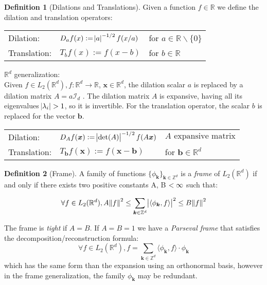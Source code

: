 \documentclass{InsightArticle}
\theoremstyle{definition}
\newtheorem{definition}{Definition}[section]
\begin{document}
\begin{definition}[Dilations and Translations]
  Given a function $f\in\mathbb{R}$ we define the dilation and translation operators\cite{heil_continuous_1989}:\par
  \begin{tabular}{lll}
    Dilation:&  $D_a f(x):=\abs{a}^{-1/2}f(x/a)$ &for $a \in \mathbb{R}\backslash\{0\}$ \\
    Translation:&   $T_b f(x):=f(x-b)$ &for $b \in \mathbb{R}$ \\
  \end{tabular}

  $\mathbb{R}^d$ generalization:\\
  Given $f \in L_2(\mathbb{R}^d), f:\mathbb{R}^d \rightarrow \mathbb{R}$, $\bm{x}\in\mathbb{R}^d$, the dilation scalar $a$ is replaced by a dilation matrix $A = a \mathcal{I}_d$ \cite{qian_wavelet_2007}. The dilation matrix $A$ is expansive, having all its eigenvalues $\abs{\lambda_i} > 1$, so it is invertible. For the translation operator, the scalar $b$ is replaced for the vector $\bm{b}$.\par
  \begin{tabular}{lll}
    Dilation:& $D_A f(\bm{x}):=\abs{\det(A)}^{-1/2}f(A\bm{x})$ &$A \text{ expansive matrix}$\\
    Translation:&   $T_{\bm{b}} f(\bm{x}):=f(\bm{x}-\bm{b})$ &for $\bm{b} \in \mathbb{R}^d$ \\
  \end{tabular}
\end{definition}

\begin{definition}[Frame]
    A family of functions $\{\phi_{\bm{k}}\}_{ \bm{k}\in\mathbb{Z}^d}$ is a \textit{frame} of $L_2(\mathbb{R}^d)$ if and only if there exists two positive constants A, B $< \infty$ such that:

\begin{equation}
  \forall f \in L_2(\mathbb{R}^d), A\norm{f}^2 \le \sum_{\bm{k}\in\mathbb{Z}^d}\abs{\langle\phi_{\bm{k}},f\rangle}^2 \le B\norm{f}^2
\end{equation}

The frame is \textit{tight} if $A=B$. If $A=B=1$ we have a \textit{Parseval frame} that satisfies the decomposition/reconstruction formula:
\begin{equation}
  \forall f \in L_2(\mathbb{R}^d), f = \sum_{\bm{k}\in\mathbb{Z}^d}\langle\phi_{\bm{k}},f\rangle \cdot \phi_{\bm{k}}
\end{equation}
which has the same form than the expansion using an orthonormal basis, however in the frame generalization, the family $\phi_{\bm{k}}$ may be redundant.
\end{definition}
\end{document}
